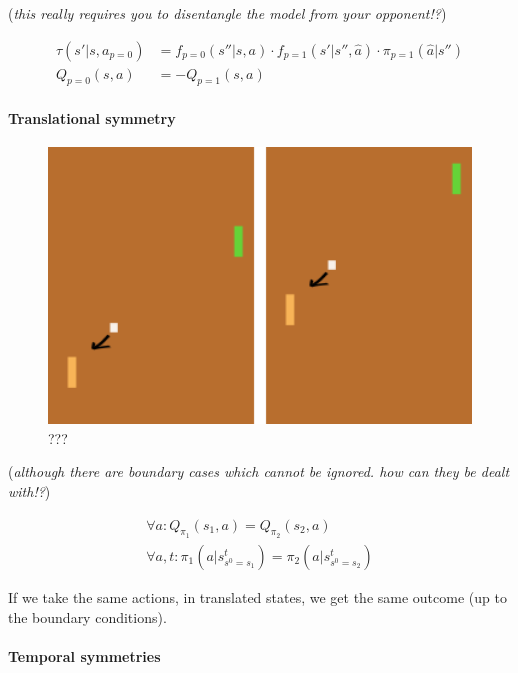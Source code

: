 (\emph{this really requires you to disentangle the model from your
opponent!?})

\begin{align}
\tau(s'|s, a_{p=0}) &= f_{p=0}(s''|s, a) \cdot f_{p=1}(s'|s'', \hat a) \cdot \pi_{p=1}(\hat a|s'') \\
Q_{p=0}(s, a) &= -Q_{p=1}(s, a)
\end{align}

\hypertarget{translational-symmetry-1}{%
\paragraph{Translational symmetry}\label{translational-symmetry-1}}

\begin{figure}
\centering
\includegraphics[width=1\textwidth,height=0.25\textheight]{../../pictures/drawings/pong-trans.png}
\caption{???}
\end{figure}

(\emph{although there are boundary cases which cannot be ignored. how
can they be dealt with!?})

\begin{align}
\forall a: Q_{\pi_1}(s_1, a) = Q_{\pi_2}(s_2, a) \\
\forall a, t: \pi_1(a|s^t_{s^0=s_1}) = \pi_2(a|s^t_{s^0=s_2})
\end{align}

If we take the same actions, in translated states, we get the same
outcome (up to the boundary conditions).

\hypertarget{temporal-symmetries}{%
\paragraph{Temporal symmetries}\label{temporal-symmetries}}

